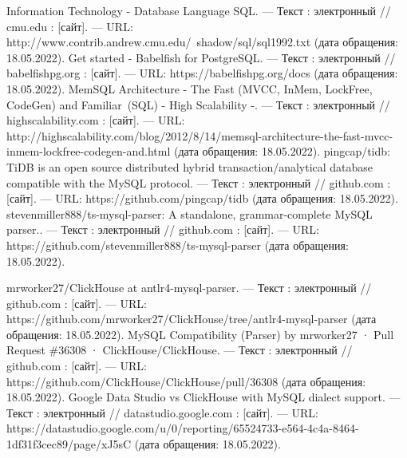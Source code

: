\begin{thebibliography}{1}
 Information Technology - Database Language SQL. — Текст : электронный // cmu.edu : [сайт]. — URL: http://www.contrib.andrew.cmu.edu/~shadow/sql/sql1992.txt (дата обращения: 18.05.2022).
 Get started - Babelfish for PostgreSQL. — Текст : электронный // babelfishpg.org : [сайт]. — URL: https://babelfishpg.org/docs (дата обращения: 18.05.2022).
 MemSQL Architecture - The Fast (MVCC, InMem, LockFree, CodeGen) and Familiar (SQL) - High Scalability -. — Текст : электронный // highscalability.com : [сайт]. — URL: http://highscalability.com/blog/2012/8/14/memsql-architecture-the-fast-mvcc-inmem-lockfree-codegen-and.html (дата обращения: 18.05.2022).
 pingcap/tidb: TiDB is an open source distributed hybrid transaction/analytical database compatible with the MySQL protocol. — Текст : электронный // github.com : [сайт]. — URL: https://github.com/pingcap/tidb (дата обращения: 18.05.2022).
 stevenmiller888/ts-mysql-parser: A standalone, grammar-complete MySQL parser.. — Текст : электронный // github.com : [сайт]. — URL: https://github.com/stevenmiller888/ts-mysql-parser (дата обращения: 18.05.2022).

 mrworker27/ClickHouse at antlr4-mysql-parser. — Текст : электронный // github.com : [сайт]. — URL: https://github.com/mrworker27/ClickHouse/tree/antlr4-mysql-parser (дата обращения: 18.05.2022).
 MySQL Compatibility (Parser) by mrworker27 · Pull Request \#36308 · ClickHouse/ClickHouse. — Текст : электронный // github.com : [сайт]. — URL: https://github.com/ClickHouse/ClickHouse/pull/36308 (дата обращения: 18.05.2022).
 Google Data Studio vs ClickHouse with MySQL dialect support. — Текст : электронный // datastudio.google.com : [сайт]. — URL: https://datastudio.google.com/u/0/reporting/65524733-e564-4c4a-8464-1df31f3cec89/page/xJ5sC (дата обращения: 18.05.2022).
\end{thebibliography}
